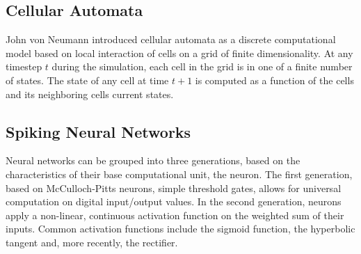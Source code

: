 \subsection{Cellular Automata}

John von Neumann introduced cellular automata as a discrete computational model based on local interaction of cells on a grid of finite dimensionality.
At any timestep $t$ during the simulation, each cell in the grid is in one of a finite number of states.
The state of any cell at time $t+1$ is computed as a function of the cells and its neighboring cells current states.

\subsection{Spiking Neural Networks}

Neural networks can be grouped into three generations, based on the characteristics of their base computational unit, the neuron.
The first generation, based on McCulloch-Pitts neurons, simple threshold gates, allows for universal computation on digital input/output values.
In the second generation, neurons apply a non-linear, continuous activation function on the weighted sum of their inputs.
Common activation functions include the sigmoid function, the hyperbolic tangent and, more recently, the rectifier.
